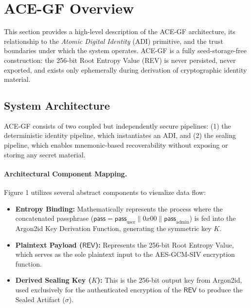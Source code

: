 \documentclass[12pt,a4paper]{article}
\begin{document}
  \section{ACE-GF Overview}

  This section provides a high-level description of the ACE-GF architecture,
  its relationship to the \emph{Atomic Digital Identity} (ADI) primitive,
  and the trust boundaries under which the system operates.
  ACE-GF is a fully seed-storage-free construction:
  the 256-bit Root Entropy Value (REV) is never persisted, never exported, and
  exists only ephemerally during derivation of cryptographic identity material.

  \subsection{System Architecture}

  ACE-GF consists of two coupled but independently secure pipelines:
  (1) the deterministic identity pipeline, which instantiates an ADI, and
  (2) the sealing pipeline, which enables mnemonic-based recoverability
  without exposing or storing any secret material.

  \paragraph{Architectural Component Mapping.}
  Figure 1 utilizes several abstract components to visualize data flow:
  \begin{itemize}
   \item \textbf{Entropy Binding:} Mathematically represents the process where the concatenated passphrase ($\mathsf{pass} = \mathsf{pass}_{\mathrm{user}} \parallel 0x00 \parallel \mathsf{pass}_{\mathrm{admin}}$) is fed into the Argon2id Key Derivation Function, generating the symmetric key $K$.
   \item \textbf{Plaintext Payload ($\mathsf{REV}$):} Represents the 256-bit Root Entropy Value, which serves as the sole plaintext input to the AES-GCM-SIV encryption function.
   \item \textbf{Derived Sealing Key ($K$):} This is the 256-bit output key from Argon2id, used exclusively for the authenticated encryption of the $\mathsf{REV}$ to produce the Sealed Artifact ($\sigma$).
  \end{itemize}
\end{document}
